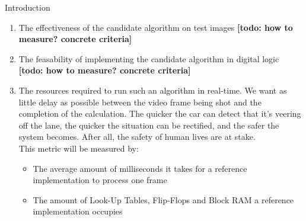 \documentclass{matthijs}
\begin{document}
\begin{hoofdstuk}{Introduction}
		\begin{enumerate}

			\item	The effectiveness of the candidate algorithm on test images \textbf{[todo: how to measure? concrete criteria]}
			\item	The feasability of implementing the candidate algorithm in digital logic \textbf{[todo: how to measure? concrete criteria]}
			\item	The resources required to run such an algorithm in real-time.
				We want as little delay as possible between the video frame being shot and the completion of the calculation.
				The quicker the car can detect that it's veering off the lane, the quicker the situation can be rectified, and the safer the system becomes.
				After all, the safety of human lives are at stake.\\
				This metric will be measured by:

				\begin{itemize}

					\item The average amount of milliseconds it takes for a reference implementation to process one frame
					\item The amount of Look-Up Tables, Flip-Flops and Block RAM a reference implementation occupies

				\end{itemize}

		\end{enumerate}

	\end{hoofdstuk}
\end{document}
